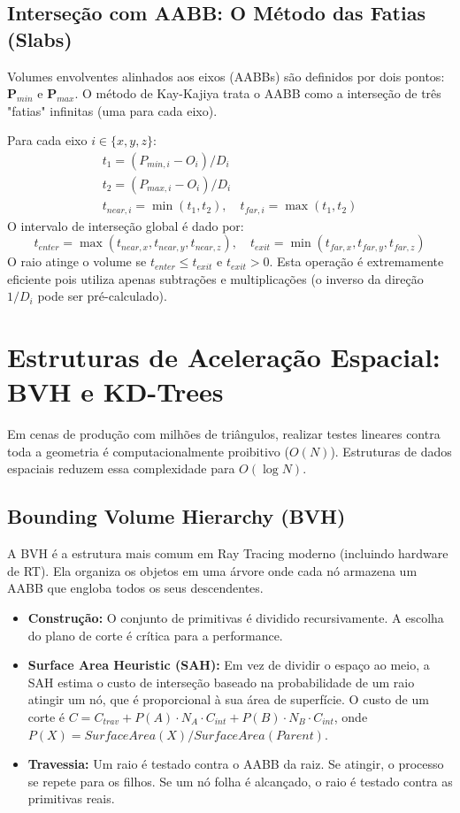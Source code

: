 \subsection{Interseção com AABB: O Método das Fatias (Slabs)}

Volumes envolventes alinhados aos eixos (AABBs) são definidos por dois pontos: $\mathbf{P}_{min}$ e $\mathbf{P}_{max}$. O método de Kay-Kajiya trata o AABB como a interseção de três "fatias" infinitas (uma para cada eixo).

Para cada eixo $i \in \{x, y, z\}$:
\begin{align}
    t_{1} = (P_{min, i} - O_i) / D_i \\
    t_{2} = (P_{max, i} - O_i) / D_i \\
    t_{near, i} = \min(t_1, t_2), \quad t_{far, i} = \max(t_1, t_2)
\end{align}
O intervalo de interseção global é dado por:
\begin{equation}
    t_{enter} = \max(t_{near, x}, t_{near, y}, t_{near, z}), \quad t_{exit} = \min(t_{far, x}, t_{far, y}, t_{far, z})
\end{equation}
O raio atinge o volume se $t_{enter} \le t_{exit}$ e $t_{exit} > 0$. Esta operação é extremamente eficiente pois utiliza apenas subtrações e multiplicações (o inverso da direção $1/D_i$ pode ser pré-calculado).

\section{Estruturas de Aceleração Espacial: BVH e KD-Trees}

Em cenas de produção com milhões de triângulos, realizar testes lineares contra toda a geometria é computacionalmente proibitivo ($O(N)$). Estruturas de dados espaciais reduzem essa complexidade para $O(\log N)$.

\subsection{Bounding Volume Hierarchy (BVH)}

A BVH é a estrutura mais comum em Ray Tracing moderno (incluindo hardware de RT). Ela organiza os objetos em uma árvore onde cada nó armazena um AABB que engloba todos os seus descendentes.
\begin{itemize}
    \item \textbf{Construção:} O conjunto de primitivas é dividido recursivamente. A escolha do plano de corte é crítica para a performance.
    \item \textbf{Surface Area Heuristic (SAH):} Em vez de dividir o espaço ao meio, a SAH estima o custo de interseção baseado na probabilidade de um raio atingir um nó, que é proporcional à sua área de superfície. O custo de um corte é $C = C_{trav} + P(A) \cdot N_A \cdot C_{int} + P(B) \cdot N_B \cdot C_{int}$, onde $P(X) = SurfaceArea(X) / SurfaceArea(Parent)$.
    \item \textbf{Travessia:} Um raio é testado contra o AABB da raiz. Se atingir, o processo se repete para os filhos. Se um nó folha é alcançado, o raio é testado contra as primitivas reais.
\end{itemize}

